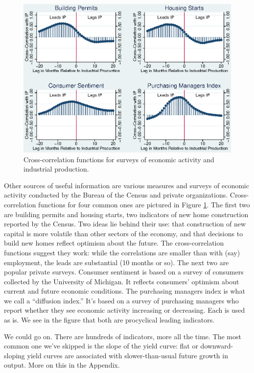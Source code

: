 \documentclass[letterpaper,12pt]{article}
\begin{document}
\begin{figure}
    \centering
    \includegraphics[scale=0.8]{xcsurvey.eps}
    \caption{Cross-correlation functions for
    surveys of economic activity and industrial production.}
    \label{fig:ccf-survey}%
\end{figure}

Other sources of useful information are various measures and surveys
of economic activity conducted by the Bureau of the Census and
private organizations.
Cross-correlation functions for four common ones are pictured in
Figure \ref{fig:ccf-survey}.
The first two are building permits and housing starts,
two indicators of new home construction reported by the Census.
Two ideas lie behind their use:
that construction of new capital is more volatile than other sectors
of the economy,
and that decisions to build new homes reflect optimism about the future.
The cross-correlation functions suggest they work:
while the correlations are
smaller than with (say) employment, the leads are substantial
(10 months or so).
The next two are popular private surveys.
Consumer sentiment is based on a survey of consumers
collected by the University of Michigan.
It reflects consumers' optimism about current and future economic conditions.
The purchasing managers index is what we call a ``diffusion index.''
It's based on a survey of purchasing managers who report whether
they see economic activity increasing or decreasing.
Each is used as is.
We see in the figure that both are procyclical leading indicators.

We could go on.  There are hundreds of indicators, more all the time.
The most common one we've skipped is the slope of the yield curve:
flat or downward-sloping yield curves are associated with slower-than-usual
future growth in output.
More on this in the Appendix.
\end{document}
